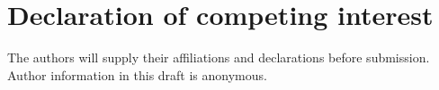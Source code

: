 \documentclass[a4paper,fleqn]{cas-dc}
\begin{document}
\section*{Declaration of competing interest}
The authors will supply their affiliations and declarations before submission. Author information in this draft is anonymous.




\clearpage
\appendix



\clearpage
\addtocounter{page}{-1}
\end{document}
